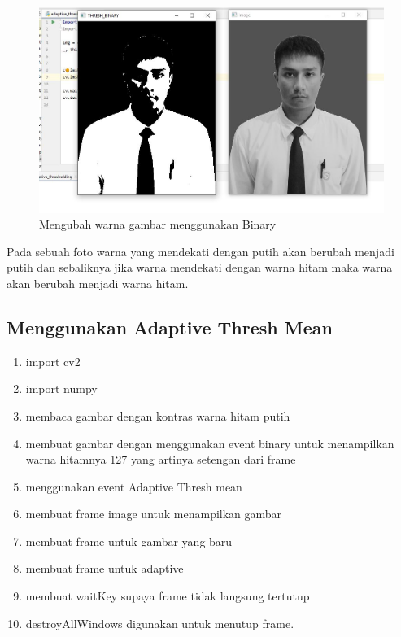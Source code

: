 \newpage
\begin{figure}[ht]
\centering
\includegraphics[scale=0.5]{figures/2,43.jpg}
\caption{Mengubah warna gambar menggunakan Binary}
\label{contoh}
\end{figure}
Pada sebuah foto warna yang mendekati dengan putih akan berubah menjadi putih dan sebaliknya jika warna mendekati dengan warna hitam maka warna akan berubah menjadi warna hitam.




\newpage
\subsection{Menggunakan Adaptive Thresh Mean}

\begin{enumerate}
	\item import cv2
	\item import numpy
	\item membaca gambar dengan kontras warna hitam putih
	\item membuat gambar dengan menggunakan event binary untuk menampilkan warna hitamnya 127 yang artinya setengan dari frame
	\item menggunakan event Adaptive Thresh mean
	\item membuat frame image untuk menampilkan gambar
	\item membuat frame untuk gambar yang baru
	\item membuat frame untuk adaptive
	\item membuat waitKey supaya frame tidak langsung tertutup
	\item destroyAllWindows digunakan untuk menutup frame.
\end{enumerate}

